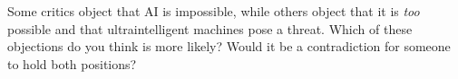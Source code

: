 \begin{exercise}
Some critics object that AI is impossible, while others object that
it is {\em too} possible and that ultraintelligent machines pose a threat.
Which of these objections do you think is more likely?  Would it be a 
contradiction for someone to hold both positions?
\end{exercise} 









